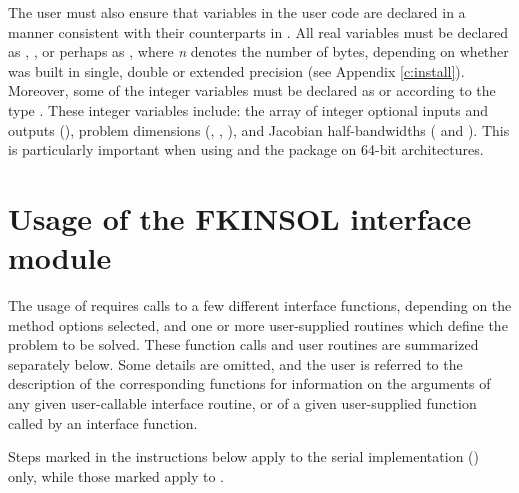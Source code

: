 The user must also ensure that variables in the user {\F} code are
declared in a manner consistent with their counterparts in {\kinsol}.
All real variables must be declared as , ,
or perhaps as , where {\em n} denotes the number of bytes,
depending on whether {\kinsol} was built in single, double or extended precision 
(see Appendix \ref{c:install}). Moreover, some of the {\F} integer variables
must be declared as  or  according to the 
{\C} type . These integer variables include: the array
of integer optional inputs and outputs (), problem dimensions (,
, ), and Jacobian half-bandwidths ( and ).
This is particularly important when using
{\kinsol} and the {\fkinsol} package on 64-bit architectures.

\section{Usage of the FKINSOL interface module}\label{ss:fkinsol_usage}

The usage of {\fkinsol} requires calls to a few different interface
functions, depending on the method options selected, and one or more
user-supplied routines which define the problem to be solved.  These
function calls and user routines are summarized separately below.
Some details are omitted, and the user is referred to the description
of the corresponding {\kinsol} functions for information on the arguments 
of any given user-callable interface routine, or of a given user-supplied 
function called by an interface function.

Steps marked  {\s} in the instructions below apply to the serial
{\nvector} implementation ({\nvecs}) only, while those marked {\p}
apply to {\nvecp}.

